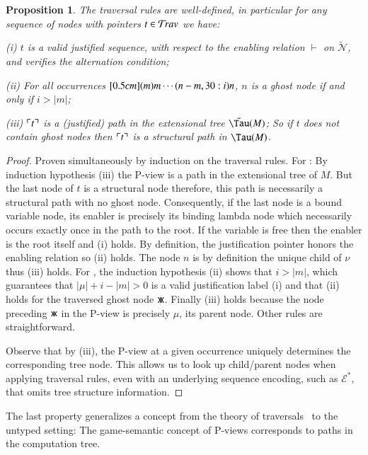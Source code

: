 \documentclass{elsarticle}
\def\shortproof{\begin{proof}}
\def\endshortproof{\end{proof}}
\theoremstyle{plain}
\newtheorem{proposition}[theorem]{Proposition}
\theoremstyle{definition}
\newcommand\Nodes{\mathcal{N}}%
\newcommand{\ghostvar}{\mathsf{x\mkern-5mu x}}
\newcommand\ExtendedNodes{\tilde{\Nodes}}
\newcommand{\enables}{\vdash} %
\newcommand{\ctree}{\Tau} %
\newcommand{\exttree}{\tilde{\Tau}} %
\newcommand{\ExternalNodes}{\Nodes^{\sf ext}}
\begin{document}
\begin{proposition}
\label{prop:ulctrav_welldefined_pathview}
The traversal rules are well-defined, in particular for any sequence of nodes with pointers $t\in \mathcal{T}\!rav$ we have:
\begin{compactitem}
\item[(i)] $t$ is a valid justified sequence, with respect to
the enabling relation $\enables$ on $\ExtendedNodes$, and verifies the alternation condition;
\item[(ii)] For all occurrences $\Pstr[0.5cm]{(m){m} \cdots (n-m,30:i){n}}$, $n$ is a ghost node if and only if $i > |m|$;
\item[(iii)] $\ulcorner t \urcorner$ is a (justified) path in the extensional tree $\exttree(M)$;
So if $t$ does not contain ghost nodes then $\ulcorner t \urcorner$ is a structural path in $\ctree(M)$.
\end{compactitem}
\end{proposition}
\shortproof
Proven simultaneously by induction on the traversal rules.
For : By induction hypothesis (iii) the P-view is a path in the extensional tree of $M$. But the last node of $t$ is a structural node therefore, this path is necessarily a structural path with no ghost node. Consequently, if the last node is a bound variable node, its enabler is precisely its binding lambda node which necessarily occurs exactly once in the path to the root. If the variable is free then the enabler is the root itself and (i) holds. By definition, the justification pointer honors the enabling relation so (ii) holds. The node $n$ is by definition the unique child of $\nu$ thus (iii) holds.
%
For \rulenamet{Lam^\ghostvar}, the induction hypothesis (ii) shows that $i>|m|$, which guarantees that $|\mu|+i-|m|>0$ is a valid justification label (i) and that (ii) holds for the traversed ghost node $\ghostvar$.
Finally (iii) holds because the node preceding $\ghostvar$ in the P-view is precisely $\mu$, its parent node.
%
Other rules are straightforward.

Observe that by (iii), the P-view at a given occurrence
uniquely determines the corresponding tree node. This allows us to look up child/parent nodes when applying traversal rules, even with an underlying sequence encoding, such as $\mathcal{E}^*$, that omits tree structure information.
\endshortproof

The last property generalizes a concept from the theory of traversals~\cite{OngLics2006,BlumPhd} to the untyped setting: The game-semantic concept of P-views corresponds to paths in the computation tree.
\end{document}
